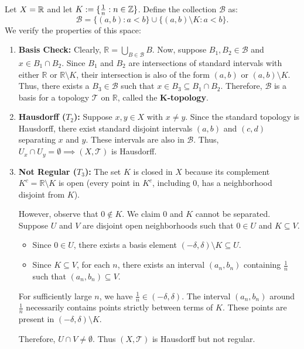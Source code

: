 \begin{exmp}
    Let $X = \mathbb{R}$ and let $K := \{ \frac{1}{n} : n \in \mathbb{Z} \}$. 
    Define the collection $\mathcal{B}$ as:
    \[
        \mathcal{B} = \{ (a, b) : a < b \} \cup \{ (a, b) \setminus K : a < b \}.
    \]
    We verify the properties of this space:
    \begin{enumerate}
        \item \textbf{Basis Check:} 
        Clearly, $\mathbb{R} = \bigcup_{B \in \mathcal{B}} B$. 
        Now, suppose $B_1, B_2 \in \mathcal{B}$ and $x \in B_1 \cap B_2$. 
        Since $B_1$ and $B_2$ are intersections of standard intervals with either $\mathbb{R}$ or $\mathbb{R} \setminus K$, their intersection is also of the form $(a, b)$ or $(a, b) \setminus K$. 
        Thus, there exists a $B_3 \in \mathcal{B}$ such that $x \in B_3 \subseteq B_1 \cap B_2$. 
        Therefore, $\mathcal{B}$ is a basis for a topology $\mathcal{T}$ on $\mathbb{R}$, called the \textbf{K-topology}.

        \item \textbf{Hausdorff ($T_2$):} 
        Suppose $x, y \in X$ with $x \neq y$. 
        Since the standard topology is Hausdorff, there exist standard disjoint intervals $(a, b)$ and $(c, d)$ separating $x$ and $y$. 
        These intervals are also in $\mathcal{B}$. 
        Thus, $U_x \cap U_y = \emptyset \implies (X, \mathcal{T})$ is Hausdorff.

        \item \textbf{Not Regular ($T_3$):} 
        The set $K$ is closed in $X$ because its complement $K^c = \mathbb{R} \setminus K$ is open (every point in $K^c$, including $0$, has a neighborhood disjoint from $K$).
        
        However, observe that $0 \notin K$. We claim $0$ and $K$ cannot be separated.
        Suppose $U$ and $V$ are disjoint open neighborhoods such that $0 \in U$ and $K \subseteq V$.
        \begin{itemize}
            \item Since $0 \in U$, there exists a basis element $(-\delta, \delta) \setminus K \subseteq U$.
            \item Since $K \subseteq V$, for each $n$, there exists an interval $(a_n, b_n)$ containing $\frac{1}{n}$ such that $(a_n, b_n) \subseteq V$.
        \end{itemize}
        For sufficiently large $n$, we have $\frac{1}{n} \in (-\delta, \delta)$. The interval $(a_n, b_n)$ around $\frac{1}{n}$ necessarily contains points strictly between terms of $K$. These points are present in $(-\delta, \delta) \setminus K$.
        
        Therefore, $U \cap V \neq \emptyset$. Thus $(X, \mathcal{T})$ is Hausdorff but not regular.
    \end{enumerate}
\end{exmp}

